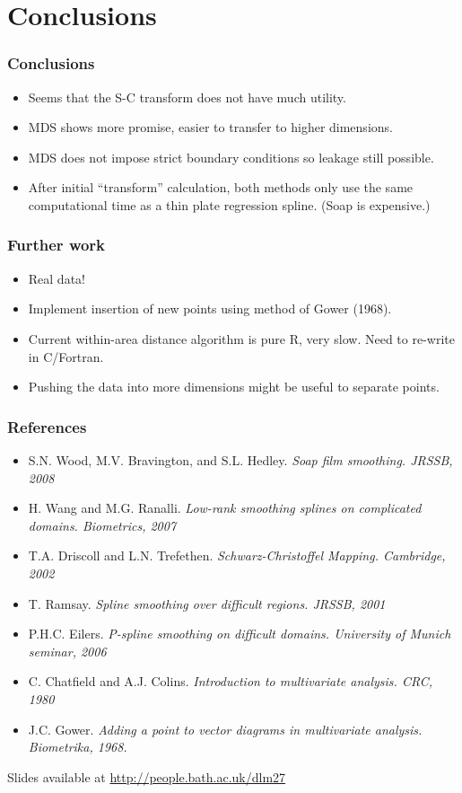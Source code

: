 \documentclass[ignorenonframetext]{beamer} %
\newcommand{\bi}{\begin{itemize}}
\newcommand{\ei}{\end{itemize}}
\begin{document}
\section{Conclusions}

\begin{frame}
	\frametitle{Conclusions}
       \bi
         \item Seems that the S-C transform does not have much utility.
         \item MDS shows more promise, easier to transfer to higher dimensions.
         \item MDS does not impose strict boundary conditions so leakage still possible.
         \item After initial ``transform'' calculation, both methods only use the same computational time as a thin plate regression spline. (Soap is expensive.)
        \ei
\end{frame}

\begin{frame}
	\frametitle{Further work}
       \bi
         \item Real data!
         \item Implement insertion of new points using method of Gower (1968).
         \item Current within-area distance algorithm is pure R, very slow. Need to re-write in C/Fortran.
         \item Pushing the data into more dimensions might be useful to separate points.  
        \ei
\end{frame}




\begin{frame}
	\frametitle{References}
       \bi
         \item S.N. Wood, M.V. Bravington, and S.L. Hedley. \emph{Soap film smoothing. JRSSB, 2008}
         \item H. Wang and M.G. Ranalli. \emph{Low-rank smoothing splines on complicated domains. Biometrics, 2007}
         \item T.A. Driscoll and L.N. Trefethen. \emph{Schwarz-Christoffel Mapping. Cambridge, 2002}
         \item T. Ramsay. \emph{Spline smoothing over difficult regions. JRSSB, 2001}
         \item P.H.C. Eilers. \emph{P-spline smoothing on difficult domains. University of Munich seminar, 2006}
	\item C. Chatfield and A.J. Colins. \emph{Introduction to multivariate analysis. CRC, 1980}
	\item J.C. Gower. \emph{Adding a point to vector diagrams in multivariate analysis. Biometrika, 1968.}
        \ei
        Slides available at \url{http://people.bath.ac.uk/dlm27}
\end{frame}
\end{document}
